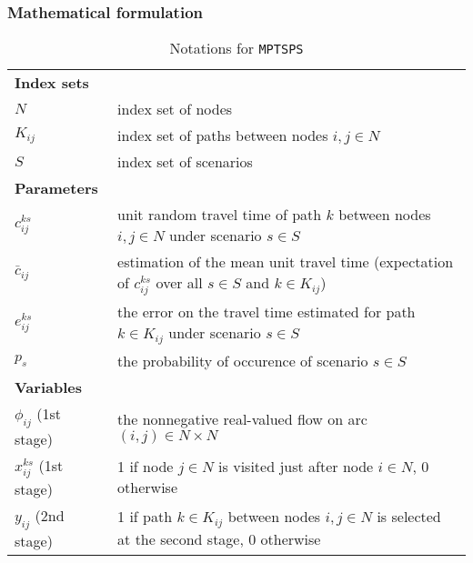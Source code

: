 \subsubsection{Mathematical formulation}
\begin{table}[H]
	\caption{Notations for \texttt{MPTSPS}}
	\label{notation}
	\resizebox{\textwidth}{!}
	{
		\begin{tabular}{ll}
			\toprule
			\textbf{Index sets} &  \\ 
			$N$ & \textrm{index set of nodes} \\ 
			$K_{ij}$ & \textrm{index set of paths between nodes $i,j\in N$} \\ 
			$S$ & \textrm{index set of scenarios}\\
			\textbf{Parameters} &   \\ 
			$c_{ij}^{ks}$ & \textrm{unit random travel time of path $k$ between nodes $i,j\in N$ under scenario $s\in S$} \\ 
			$\bar{c}_{ij}$ & \textrm{estimation of the mean unit travel time (expectation of $c_{ij}^{ks}$ over all $s\in S$ and $k\in K_{ij}$)} \\ 
			$e_{ij}^{ks}$ & \textrm{the error on the travel time estimated for path $k\in K_{ij}$ under scenario $s\in S$} \\ 
			$p_{s}$ & \textrm{the probability of occurence of scenario $s\in S$} \\ 
			\textbf{Variables} &  \\ 
			$\phi_{ij}$ (1st stage) & \textrm{the nonnegative real-valued flow on arc $(i,j)\in N\times N$}\\
			$x_{ij}^{ks}$ (1st stage) & \textrm{1 if node $j\in N$ is visited just after node $i\in N$, 0 otherwise} \\ 
			$y_{ij}$ (2nd stage)& \textrm{1 if path $k\in K_{ij}$ between nodes $i,j\in N$ is selected at the second stage, 0 otherwise} \\ 

			\hline
		\end{tabular}
 	}
\end{table} 

